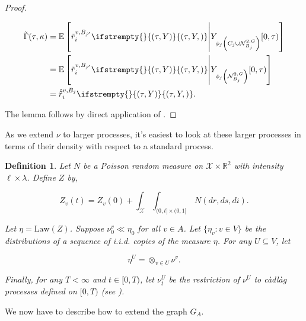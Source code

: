 \documentclass[12pt]{article}
\newcommand{\mb}{\mathbb}
\newcommand{\mc}{\mathcal}
\newcommand{\te}{\text}
\newcommand{\ind}{\hspace{24pt}}
\newcommand{\ex}[1]{\mb{E}\left[#1\right]}			%
\newcommand{\sta}{\mc{X}}							%
\newcommand{\dgneigh}[2]{\mc{N}^{2,#1}_{#2}}		%
\newcommand{\poiss}{N}								%
\newcommand{\leb}{\lambda}							%
\newcommand{\Sm}{\ell}								%
\newcommand{\rate}{r}								%
\newcommand{\vind}[1]{_{#1}}						%
\newcommand{\tme}[1]{(#1)}							%
\newcommand{\tmi}[1]{#1}							%
\newcommand{\vpara}[1]{^{#1}}						%
\newcommand{\stpara}[1]{_{#1}}						%
\newcommand{\tpara}[1]{_{#1}}						%
\newcommand{\tmepro}[3]{
\ifstrempty{#3}{
	\left(#1,#2\right)}{
	\left(#1,#2,#3\right)}}							%
\newcommand{\Xg}{Y}									%
\newcommand{\brate}{\alt{\rate}}					%
\newcommand{\alt}[1]{\tilde{#1}}					%
\newcommand{\rt}{\tau}								%
\renewcommand{\mark}{\kappa}						%
\newcommand{\ratee}{\Gamma}							%
\newcommand{\cratee}{\alt{\ratee}}					%
\newcommand{\mm}{\nu}								%
\newcommand{\law}{\te{Law}}							%
\newcommand{\Xh}{Z}									%
\newcommand{\bcrate}{\hat{\brate}}					%
\newcommand{\mmm}{\eta}								%
\newcommand{\vjpara}[2]{^{#1,#2}}					%
\newtheorem{defn}[thms]{Definition}
\begin{document}
\begin{proof}
\begin{description}
\begin{align*}
\cratee(\rt,\mark) &= \ex{\brate\vjpara{v}{B_{j'}}\stpara{i}\tmepro{\rt}{\Xg}{}\middle|\Xg\vind{\phi_j\left(C_j\cup\dgneigh{G}{B_j}\right)}\tmi{[0,\rt)}}\\
&= \ex{\brate\vjpara{v}{B_{j'}}\stpara{i}\tmepro{\rt}{\Xg}{}\middle|\Xg\vind{\phi_j\left(\dgneigh{G}{B_j}\right)}\tmi{[0,\rt)}}\\
&= \bcrate\vjpara{v}{B_j}\stpara{i}\tmepro{\rt}{\Xg}{}.
\end{align*}
\end{description}

The lemma follows by direct application of \cite[Exercise 14.7.1]{DalVer08}.
\end{proof}

As we extend \(\mm\) to larger processes, it's easiest to look at these larger processes in terms of their density with respect to a standard process.

\begin{defn}
Let \(\poiss\) be a Poisson random measure on \(\sta\times\mb{R}^2\) with intensity \(\Sm\times\leb\). Define \(\Xh\) by,

\[\Xh\vind{v}\tme{t} = \Xh\vind{v}\tme{0} + \int_{\sta}\int_{(0,t]\times (0,1]}\,\poiss(dr,ds,di).\]

\ind Let \(\mmm = \law(\Xh)\). Suppose \(\mm\vpara{v}\tpara{0}\ll\mmm\tpara{0}\) for all \(v\in A\). Let \(\{\mmm\vind{v}:v\in V\}\) be the distributions of a sequence of i.i.d. copies of the measure \(\mmm\). For any \(U\subseteq V\), let 

\[\mmm\vpara{U} = \otimes_{v\in U} \mm\vpara{v}.\]

Finally, for any \(T < \infty\) and \(t\in [0,T)\), let \(\mm\vpara{U}\tpara{t}\) be the restriction of \(\mm\vpara{U}\) to c\`adl\`ag processes defined on \([0,T)\) (see \cite[section \ref{F-not::p}]{F}).
\label{Uq::eta}
\end{defn}

We now have to describe how to extend the graph \(G\vind{A}\).
\end{document}
